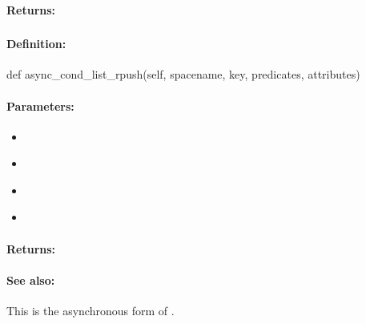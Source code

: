 \paragraph{Returns:}


\pagebreak
\subsubsection{}
\label{api:python:async_cond_list_rpush}


\paragraph{Definition:}
\begin{pythoncode}
def async_cond_list_rpush(self, spacename, key, predicates, attributes)
\end{pythoncode}

\paragraph{Parameters:}
\begin{itemize}[noitemsep]
\item {}\\

\item {}\\

\item {}\\

\item {}\\

\end{itemize}

\paragraph{Returns:}


\paragraph{See also:}  This is the asynchronous form of .

